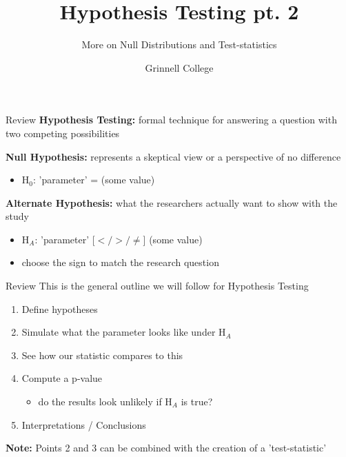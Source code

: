 \documentclass{beamer}
\title[Introduction to Statistics]{Hypothesis Testing pt. 2}
\subtitle{More on Null Distributions and Test-statistics}
\author{Grinnell College}
\date{}
\begin{document}
\begin{frame}
  \titlepage
\end{frame}

\begin{frame}{Review}
\textbf{Hypothesis Testing:} formal technique for answering a question with two competing possibilities \vspace{6mm}

\textbf{Null Hypothesis:} represents a skeptical view or a perspective of no difference
\begin{itemize}
    \item H$_0$: 'parameter' = (some value)
\end{itemize}\vspace{6mm}

\textbf{Alternate Hypothesis:} what the researchers actually want to show with the study
\begin{itemize}
    \item H$_A$: 'parameter'  [$</>/\neq$]  (some value)
    \item choose the sign to match the research question
\end{itemize}
\end{frame}

\begin{frame}{Review}
This is the general outline we will follow for Hypothesis Testing \vspace{1mm}
\begin{enumerate}
    \item Define hypotheses
    \item Simulate what the parameter looks like under H$_A$
    \item See how our statistic compares to this
    \item Compute a p-value
    \begin{itemize}
        \item do the results look unlikely if H$_A$ is true?
    \end{itemize}
    \item Interpretations / Conclusions
\end{enumerate} \vspace{12mm}

\textbf{Note:} Points 2 and 3 can be combined with the creation of a 'test-statistic'
\end{frame}
\end{document}
